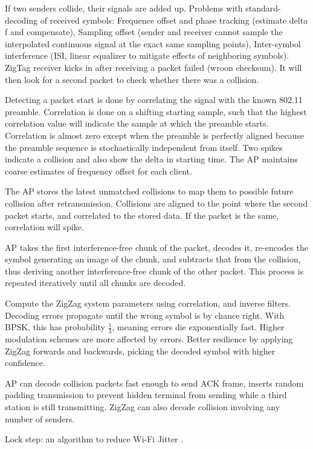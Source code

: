 If two senders collide, their signals are added up. Problems with standard-decoding of received symbols: Frequence offset and phase tracking (estimate delta f and compensate), Sampling offset (sender and receiver cannot sample the interpolated continuous signal at the exact same sampling points), Inter-symbol interference (ISI, linear equalizer to mitigate effects of neighboring symbols). ZigTag receiver kicks in after receiving a packet failed (wroon checksum).  It will then look for a second packet to check whether there was a collision.

Detecting a packet start is done by correlating the signal with the known 802.11 preamble. Correlation is done on a shifting starting sample, such that the highest correlation value will indicate the sample at which the preamble starts. Correlation is almost zero except when the preamble is perfectly aligned because the preamble sequence is stochastically independent from itself. Two spikes indicate a collision and also show the delta in starting time. The AP maintains coarse estimates of frequency offset for each client.

The AP stores the latest unmatched collisions to map them to possible future collision after retransmission. Collisions are aligned to the point where the second packet starts, and correlated to the stored data. If the packet is the same, correlation will spike.

AP takes the first interference-free chunk of the packet, decodes it, re-encodes the symbol generating an image of the chunk, and subtracts that from the collision, thus deriving another interference-free chunk of the other packet. This process is repeated iteratively until all chunks are decoded.

Compute the ZigZag system parameters using correlation, and inverse filters. Decoding errors propagate until the wrong symbol is by chance right. With BPSK, this has probability $\frac{1}{3}$, meaning errors die exponentially fast. Higher modulation schemes are more affected by errors. Better resilience by applying ZigZag forwards and backwards, picking the decoded symbol with higher confidence.

AP can decode collision packets fast enough to send ACK frame, inserts random padding transmission to prevent hidden terminal from sending while a third station is still transmitting. ZigZag can also decode collision involving any number of senders.

Lock step: an algorithm to reduce Wi-Fi Jitter \cite{lin2009}.\\

